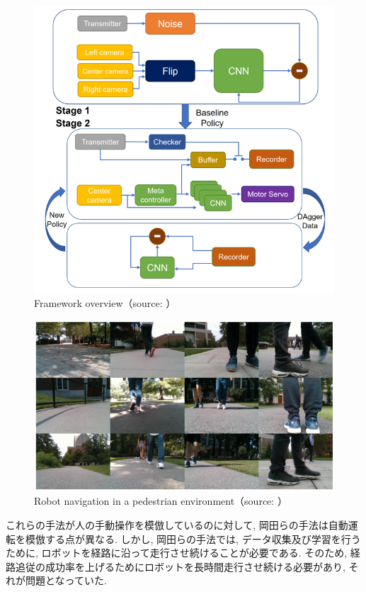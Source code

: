 \begin{figure}[h]
     \centering
     \includegraphics[keepaspectratio, scale=0.4]
     {images/jing-bi.png}
     \caption{Framework overview（source: \cite{Jing}）}
     \label{Fig:jing-bi}
     \end{figure}

\begin{figure}[h]
     \centering
     \includegraphics[keepaspectratio, scale=0.4]
     {images/pedestrian.png}
     \caption{Robot navigation in a pedestrian environment（source: \cite{Jing}）}
     \label{Fig:pedestrian}
     \end{figure}

\newpage
これらの手法が人の手動操作を模倣しているのに対して, 岡田らの手法は自動運転を模倣する点が異なる. しかし, 岡田らの手法では, データ収集及び学習を行うために, ロボットを経路に沿って走行させ続けることが必要である. そのため, 経路追従の成功率を上げるためにロボットを長時間走行させ続ける必要があり, それが問題となっていた. 

